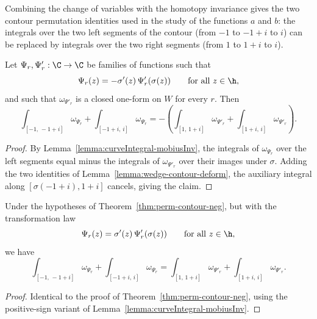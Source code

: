 Combining the change of variables with the homotopy invariance gives the two contour permutation
identities used in the study of the functions $a$ and $b$: the integrals over the two left
segments of the contour (from $-1$ to $-1+i$ to $i$) can be replaced by integrals over the two
right segments (from $1$ to $1+i$ to $i$).

\begin{theorem}\label{thm:perm-contour-neg}\leanok
  Let $\Psi_r, \Psi'_r : \C \to \C$ be families of functions such that
  \[
    \Psi_r(z) = -\sigma'(z)\, \Psi'_r(\sigma(z)) \qquad \text{for all } z \in \h,
  \]
  and such that $\omega_{\Psi'_r}$ is a closed one-form on $W$ for every $r$. Then
  \[
    \int_{[-1,\, -1+i]} \omega_{\Psi_r} + \int_{[-1+i,\, i]} \omega_{\Psi_r}
      = -\left( \int_{[1,\, 1+i]} \omega_{\Psi'_r} + \int_{[1+i,\, i]} \omega_{\Psi'_r} \right).
  \]
\end{theorem}
\begin{proof}\leanok
  By Lemma~\ref{lemma:curveIntegral-mobiusInv}, the integrals of $\omega_{\Psi_r}$ over the left
  segments equal minus the integrals of $\omega_{\Psi'_r}$ over their images under $\sigma$.
  Adding the two identities of Lemma~\ref{lemma:wedge-contour-deform}, the auxiliary integral
  along $[\sigma(-1+i), 1+i]$ cancels, giving the claim.
\end{proof}

\begin{theorem}\label{thm:perm-contour-pos}\leanok
  Under the hypotheses of Theorem~\ref{thm:perm-contour-neg}, but with the transformation law
  \[
    \Psi_r(z) = \sigma'(z)\, \Psi'_r(\sigma(z)) \qquad \text{for all } z \in \h,
  \]
  we have
  \[
    \int_{[-1,\, -1+i]} \omega_{\Psi_r} + \int_{[-1+i,\, i]} \omega_{\Psi_r}
      = \int_{[1,\, 1+i]} \omega_{\Psi'_r} + \int_{[1+i,\, i]} \omega_{\Psi'_r}.
  \]
\end{theorem}
\begin{proof}\leanok
  Identical to the proof of Theorem~\ref{thm:perm-contour-neg}, using the positive-sign variant of
  Lemma~\ref{lemma:curveIntegral-mobiusInv}.
\end{proof}

